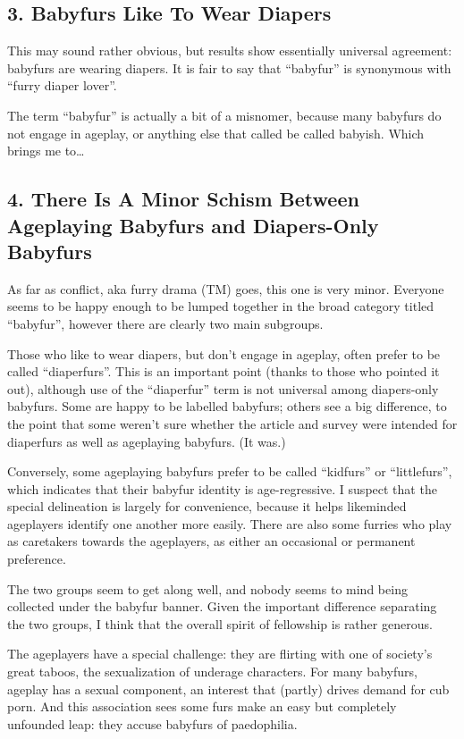 \subsection*{3. Babyfurs Like To Wear Diapers}

This may sound rather obvious, but results show essentially universal agreement: babyfurs are wearing diapers. It is fair to say that ``babyfur'' is synonymous with ``furry diaper lover''.

The term ``babyfur'' is actually a bit of a misnomer, because many babyfurs do not engage in ageplay, or anything else that called be called babyish. Which brings me to…

\subsection*{4. There Is A Minor Schism Between Ageplaying Babyfurs and Diapers-Only Babyfurs}

As far as conflict, aka furry drama (TM) goes, this one is very minor. Everyone seems to be happy enough to be lumped together in the broad category titled ``babyfur'', however there are clearly two main subgroups.

Those who like to wear diapers, but don't engage in ageplay, often prefer to be called ``diaperfurs''. This is an important point (thanks to those who pointed it out), although use of the ``diaperfur'' term is not universal among diapers-only babyfurs. Some are happy to be labelled babyfurs; others see a big difference, to the point that some weren't sure whether the article and survey were intended for diaperfurs as well as ageplaying babyfurs. (It was.)

Conversely, some ageplaying babyfurs prefer to be called ``kidfurs'' or ``littlefurs'', which indicates that their babyfur identity is age-regressive. I suspect that the special delineation is largely for convenience, because it helps likeminded ageplayers identify one another more easily. There are also some furries who play as caretakers towards the ageplayers, as either an occasional or permanent preference.

The two groups seem to get along well, and nobody seems to mind being collected under the babyfur banner. Given the important difference separating the two groups, I think that the overall spirit of fellowship is rather generous.

The ageplayers have a special challenge: they are flirting with one of society's great taboos, the sexualization of underage characters. For many babyfurs, ageplay has a sexual component, an interest that (partly) drives demand for cub porn. And this association sees some furs make an easy but completely unfounded leap: they accuse babyfurs of paedophilia.

